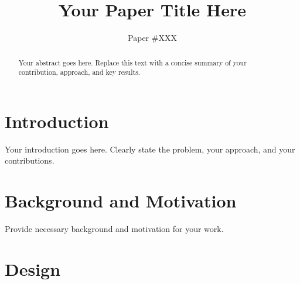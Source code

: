 \documentclass[letterpaper,twocolumn,10pt]{article}
\begin{document}
\title{Your Paper Title Here}

\author{Paper \#XXX}  %

\maketitle

\begin{abstract}
Your abstract goes here. Replace this text with a concise summary of your
contribution, approach, and key results.
\end{abstract}

\section{Introduction}
\label{sec:intro}


Your introduction goes here. Clearly state the problem, your approach,
and your contributions.

\section{Background and Motivation}
\label{sec:background}

Provide necessary background and motivation for your work.

\section{Design}
\label{sec:design}
\end{document}
